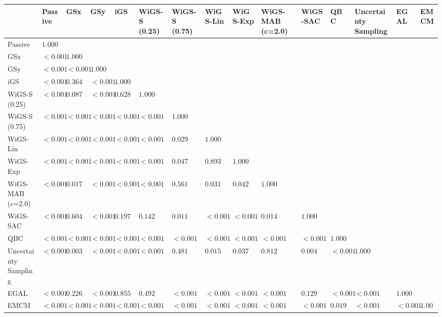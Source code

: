 \begin{tabular}{lllllllllllllll}
\toprule
 & Passive & GSx & GSy & iGS & WiGS-S (0.25) & WiGS-S (0.75) & WiGS-Lin & WiGS-Exp & WiGS-MAB (c=2.0) & WiGS-SAC & QBC & Uncertainty Sampling & EGAL & EMCM \\
\midrule
Passive & $1.000$ &  &  &  &  &  &  &  &  &  &  &  &  &  \\
GSx & $<0.001$ & $1.000$ &  &  &  &  &  &  &  &  &  &  &  &  \\
GSy & $<0.001$ & $<0.001$ & $1.000$ &  &  &  &  &  &  &  &  &  &  &  \\
iGS & $<0.001$ & $0.364$ & $<0.001$ & $1.000$ &  &  &  &  &  &  &  &  &  &  \\
WiGS-S (0.25) & $<0.001$ & $0.087$ & $<0.001$ & $0.628$ & $1.000$ &  &  &  &  &  &  &  &  &  \\
WiGS-S (0.75) & $<0.001$ & $<0.001$ & $<0.001$ & $<0.001$ & $<0.001$ & $1.000$ &  &  &  &  &  &  &  &  \\
WiGS-Lin & $<0.001$ & $<0.001$ & $<0.001$ & $<0.001$ & $<0.001$ & $0.029$ & $1.000$ &  &  &  &  &  &  &  \\
WiGS-Exp & $<0.001$ & $<0.001$ & $<0.001$ & $<0.001$ & $<0.001$ & $0.047$ & $0.893$ & $1.000$ &  &  &  &  &  &  \\
WiGS-MAB (c=2.0) & $<0.001$ & $0.017$ & $<0.001$ & $<0.001$ & $<0.001$ & $0.561$ & $0.031$ & $0.042$ & $1.000$ &  &  &  &  &  \\
WiGS-SAC & $<0.001$ & $0.604$ & $<0.001$ & $0.197$ & $0.142$ & $0.011$ & $<0.001$ & $<0.001$ & $0.014$ & $1.000$ &  &  &  &  \\
QBC & $<0.001$ & $<0.001$ & $<0.001$ & $<0.001$ & $<0.001$ & $<0.001$ & $<0.001$ & $<0.001$ & $<0.001$ & $<0.001$ & $1.000$ &  &  &  \\
Uncertainty Sampling & $<0.001$ & $0.003$ & $<0.001$ & $<0.001$ & $<0.001$ & $0.481$ & $0.015$ & $0.037$ & $0.812$ & $0.004$ & $<0.001$ & $1.000$ &  &  \\
EGAL & $<0.001$ & $0.226$ & $<0.001$ & $0.855$ & $0.492$ & $<0.001$ & $<0.001$ & $<0.001$ & $<0.001$ & $0.129$ & $<0.001$ & $<0.001$ & $1.000$ &  \\
EMCM & $<0.001$ & $<0.001$ & $<0.001$ & $<0.001$ & $<0.001$ & $<0.001$ & $<0.001$ & $<0.001$ & $<0.001$ & $<0.001$ & $0.019$ & $<0.001$ & $<0.001$ & $1.000$ \\
\bottomrule
\end{tabular}
